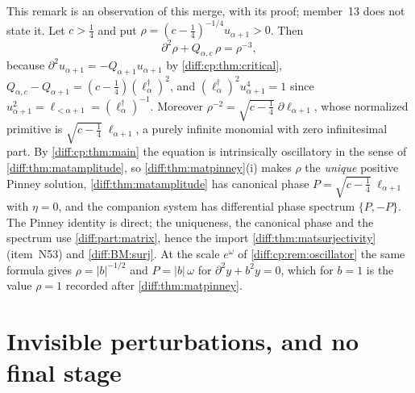 \documentclass[11pt,letterpaper]{article}
\numberwithin{equation}{section}
\theoremstyle{definition}
\theoremstyle{remark}
\newcommand{\der}{\partial}
\newcommand{\abs}[1]{\lvert#1\rvert}
\begin{document}
\begin{remark}
\label{diff:cp:rem:pinney}
This remark is an observation of this merge, with its proof; member~13 does
not state it. Let $c>\frac14$ and put
$\rho=(c-\frac14)^{-1/4}u_{\alpha+1}>0$. Then
\[
 \der^{2}\rho+Q_{\alpha,c}\,\rho=\rho^{-3},
\]
because $\der^{2}u_{\alpha+1}=-Q_{\alpha+1}u_{\alpha+1}$ by
\cref{diff:cp:thm:critical}, $Q_{\alpha,c}-Q_{\alpha+1}=(c-\frac14)(\ell_{\alpha}^{\dagger})^{2}$,
and $(\ell_{\alpha}^{\dagger})^{2}u_{\alpha+1}^{4}=1$ since
$u_{\alpha+1}^{2}=\ell_{<\alpha+1}=(\ell_{\alpha}^{\dagger})^{-1}$. Moreover
$\rho^{-2}=\sqrt{c-\frac14}\;\der\ell_{\alpha+1}$, whose normalized primitive is
$\sqrt{c-\frac14}\;\ell_{\alpha+1}$, a purely infinite monomial with zero
infinitesimal part. By \cref{diff:cp:thm:main} the equation is intrinsically
oscillatory in the sense of \cref{diff:thm:matamplitude}, so
\cref{diff:thm:matpinney}(i) makes $\rho$ the \emph{unique} positive Pinney
solution, \cref{diff:thm:matamplitude} has canonical phase
$P=\sqrt{c-\frac14}\;\ell_{\alpha+1}$ with $\eta=0$, and the companion system has
differential phase spectrum $\{P,-P\}$. The Pinney identity is direct; the
uniqueness, the canonical phase and the spectrum use \cref{diff:part:matrix},
hence the import \cref{diff:thm:matsurjectivity} (item~N53) and
\ref{diff:BM:surj}. At the scale $e^{\omega}$ of \cref{diff:cp:rem:oscillator}
the same formula gives $\rho=\abs b^{-1/2}$ and $P=\abs b\,\omega$ for
$\der^{2}y+b^{2}y=0$, which for $b=1$ is the value $\rho=1$ recorded after
\cref{diff:thm:matpinney}.
\end{remark}

\section{Invisible perturbations, and no final stage}
\label{diff:cp:sec:invisible}
\end{document}
